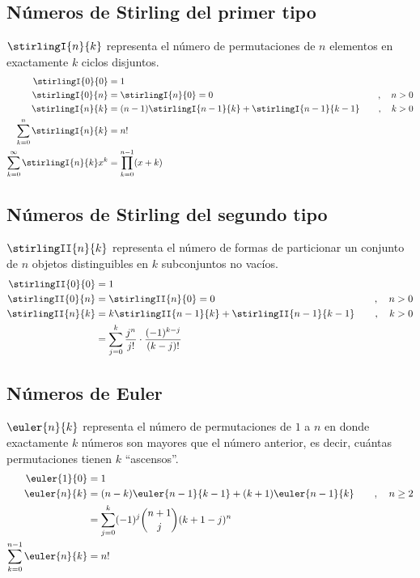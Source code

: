 		\subsection{Números de Stirling del primer tipo}
					$\stirlingI{n}{k}$ representa el número de permutaciones de $n$ elementos en exactamente $k$ ciclos disjuntos.
					\begin{align*}
						\stirlingI{0}{0} &= 1 \\
						\stirlingI{0}{n} &= \stirlingI{n}{0} = 0 \quad &, \quad n>0 \\
						\stirlingI{n}{k} &= (n-1)\stirlingI{n-1}{k} + \stirlingI{n-1}{k-1} \quad &, \quad k>0 \\
						\sum_{k=0}^{n} \stirlingI{n}{k} &= n! \\
						\sum_{k=0}^{\infty} \stirlingI{n}{k} x^k &= \prod_{k=0}^{n-1}(x+k)
					\end{align*}
				
				\subsection{Números de Stirling del segundo tipo}
					$\stirlingII{n}{k}$ representa el número de formas de particionar un conjunto de $n$ objetos distinguibles en $k$ subconjuntos no vacíos.
					\begin{align*}
						\stirlingII{0}{0} &= 1 \\
						\stirlingII{0}{n} &= \stirlingII{n}{0} = 0 \quad &, \quad n>0 \\
						\stirlingII{n}{k} &= k\stirlingII{n-1}{k} + \stirlingII{n-1}{k-1} \quad &, \quad k>0 \\
						&= \sum_{j=0}^{k} \dfrac{j^n}{j!} \cdot \dfrac{(-1)^{k-j}}{(k-j)!}
					\end{align*}
				
				\subsection{Números de Euler}
					$\euler{n}{k}$ representa el número de permutaciones de $1$ a $n$ en donde exactamente $k$ números son mayores que el número anterior, es decir, cuántas permutaciones tienen $k$ ``ascensos''.
					\begin{align*}
						\euler{1}{0} &= 1 \\
						\euler{n}{k} &= (n-k)\euler{n-1}{k-1} + (k+1)\euler{n-1}{k} \quad &, \quad n \geq 2 \\
						&= \sum_{j=0}^{k} (-1)^j \binom{n+1}{j} (k+1-j)^n \\
						\sum_{k=0}^{n-1} \euler{n}{k} &= n!
					\end{align*}
				
